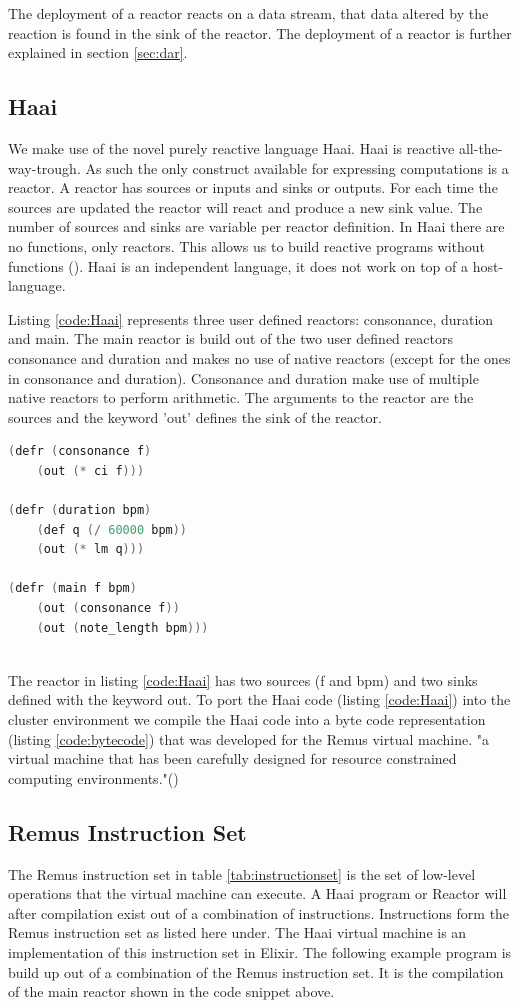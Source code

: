 \documentclass[a4paper]{book}
\begin{document}
The deployment of a reactor reacts on a data stream, that data altered by the reaction is found in the sink of the reactor. The deployment of a reactor is further explained in section \ref{sec:dar}.

\subsection{Haai}
We make use of the novel purely reactive language Haai. Haai is reactive all-the-way-trough. As such the only construct available for expressing computations is a reactor. A reactor has sources or inputs and sinks or outputs. For each time the sources are updated the reactor will react and produce a new sink value. The number of sources and sinks are variable per reactor definition. In Haai there are no functions, only reactors. This allows us to build reactive programs without functions (\cite{oeyen_reactive_2024}). Haai is an independent language, it does not work on top of a host-language.  

Listing \ref{code:Haai} represents three user defined reactors: consonance, duration and main. The main reactor is build out of the two user defined reactors consonance and duration and makes no use of native reactors (except for the ones in consonance and duration). Consonance and duration make use of multiple native reactors to perform arithmetic. The arguments to the reactor are the sources and the keyword 'out' defines the sink of the reactor.

\begin{lstlisting}[language=C, caption={Haai code}, captionpos=b,label={code:Haai}, basicstyle=\ttfamily, frame=single]
(defr (consonance f)
	(out (* ci f)))

(defr (duration bpm)
	(def q (/ 60000 bpm))
	(out (* lm q)))

(defr (main f bpm)
	(out (consonance f))
	(out (note_length bpm)))
	
\end{lstlisting}
The reactor in listing \ref{code:Haai} has two sources (f and bpm) and two sinks defined with the keyword out. To port the Haai code (listing \ref{code:Haai}) into the cluster environment we compile the Haai code into a byte code representation (listing \ref{code:bytecode}) that was developed for the Remus virtual machine. "a virtual machine that has been carefully designed for resource constrained computing environments."(\cite{oeyen_remus_2022})


\subsection*{Remus Instruction Set}
The Remus instruction set in table \ref{tab:instructionset} is the set of low-level operations that the virtual machine can execute. A Haai program or Reactor will after compilation exist out of a combination of instructions. Instructions form the Remus instruction set as listed here under. The Haai virtual machine is an implementation of this instruction set in Elixir. The following example program is build up out of a combination of the Remus instruction set. It is the compilation of the main reactor shown in the code snippet above. 
\end{document}
